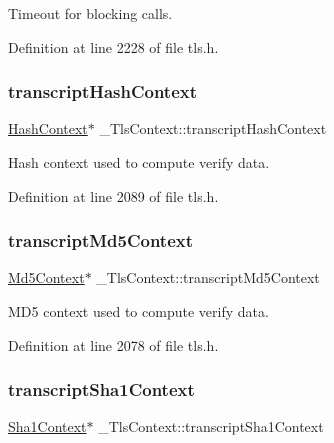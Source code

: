 Timeout for blocking calls. 



Definition at line 2228 of file tls.\+h.

\mbox{\label{struct__TlsContext_ab74ea75f1a39578a7d48ecef4f2fb87e}} 
\subsubsection{\texorpdfstring{transcript\+Hash\+Context}{transcriptHashContext}}
{\footnotesize\ttfamily \hyperlink{structHashContext}{Hash\+Context}$\ast$ \+\_\+\+Tls\+Context\+::transcript\+Hash\+Context}



Hash context used to compute verify data. 



Definition at line 2089 of file tls.\+h.

\mbox{\label{struct__TlsContext_afb02e52ed57b23420a3b7534f2da61db}} 
\subsubsection{\texorpdfstring{transcript\+Md5\+Context}{transcriptMd5Context}}
{\footnotesize\ttfamily \hyperlink{structMd5Context}{Md5\+Context}$\ast$ \+\_\+\+Tls\+Context\+::transcript\+Md5\+Context}



M\+D5 context used to compute verify data. 



Definition at line 2078 of file tls.\+h.

\mbox{\label{struct__TlsContext_a6217c7805de239fc28daac6c9963e51f}} 
\subsubsection{\texorpdfstring{transcript\+Sha1\+Context}{transcriptSha1Context}}
{\footnotesize\ttfamily \hyperlink{structSha1Context}{Sha1\+Context}$\ast$ \+\_\+\+Tls\+Context\+::transcript\+Sha1\+Context}



